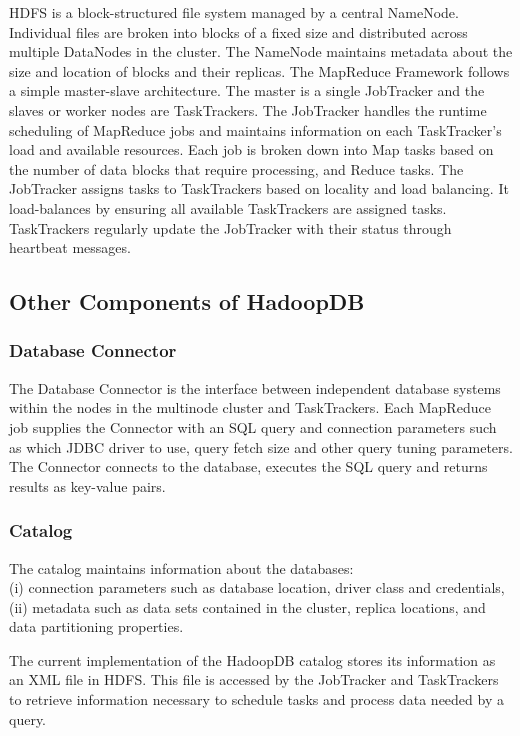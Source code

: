 \documentclass[9pt,twocolumn,twoside]{styles/osajnl}
\begin{document}
HDFS\cite{hadoop-cluster-setup} is a block-structured file system managed by a central NameNode. Individual files are broken into blocks of a fixed size and distributed across multiple DataNodes in the cluster. The
NameNode maintains metadata about the size and location of blocks and their replicas.
The MapReduce Framework follows a simple master-slave architecture. The master is a single JobTracker and the slaves or worker nodes are TaskTrackers. The JobTracker handles the runtime
scheduling of MapReduce jobs and maintains information on each TaskTracker’s load and available resources. Each job is broken down into Map tasks based on the number of data blocks that
require processing, and Reduce tasks. The JobTracker assigns tasks to TaskTrackers based on locality and load balancing. It load-balances by ensuring all available TaskTrackers are assigned tasks. TaskTrackers regularly update the JobTracker with their status through heartbeat messages.


\subsection{Other Components of HadoopDB}

\subsubsection{Database Connector}
The Database Connector is the interface between independent database systems within the nodes in the multinode cluster and TaskTrackers. Each MapReduce job supplies the Connector with an SQL query and connection parameters such as which JDBC driver to use, query fetch size and other query tuning parameters. The Connector connects to the database, executes the SQL query and returns results as key-value pairs.

\subsubsection{Catalog}
The catalog maintains information about the databases:
\\(i) connection parameters such as database
location, driver class and credentials, 
\\(ii) metadata such as data sets contained in the cluster, replica locations, and data partitioning properties.

The current implementation of the HadoopDB catalog stores its information as an XML file in HDFS. This file is accessed by the JobTracker and TaskTrackers to retrieve information necessary
to schedule tasks and process data needed by a query.
\end{document}
